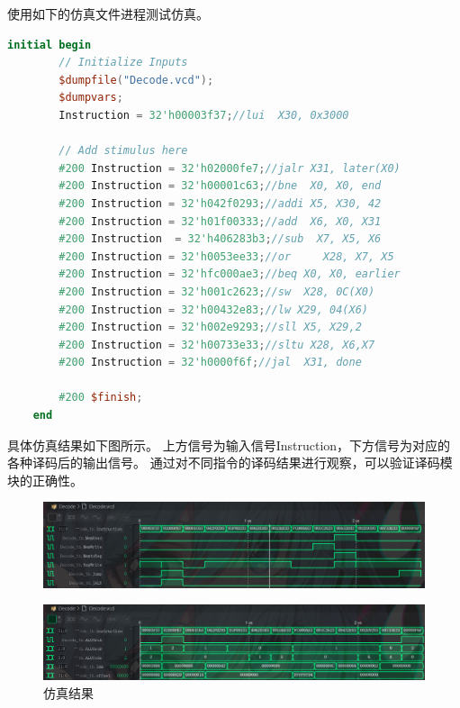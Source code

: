 \documentclass[12pt,hyperref,a4paper,UTF8]{ctexart}
\begin{document}
使用如下的仿真文件进程测试仿真。
\begin{lstlisting}[language=Verilog,caption=仿真tb文件]
	initial begin
		// Initialize Inputs
		$dumpfile("Decode.vcd");
        $dumpvars;
		Instruction = 32'h00003f37;//lui  X30, 0x3000	
        
		// Add stimulus here		
		#200 Instruction = 32'h02000fe7;//jalr X31, later(X0)
		#200 Instruction = 32'h00001c63;//bne  X0, X0, end
		#200 Instruction = 32'h042f0293;//addi X5, X30, 42
		#200 Instruction = 32'h01f00333;//add  X6, X0, X31
		#200 Instruction  = 32'h406283b3;//sub  X7, X5, X6		
		#200 Instruction = 32'h0053ee33;//or	 X28, X7, X5		
		#200 Instruction = 32'hfc000ae3;//beq X0, X0, earlier
		#200 Instruction = 32'h001c2623;//sw  X28, 0C(X0)	
		#200 Instruction = 32'h00432e83;//lw X29, 04(X6)
		#200 Instruction = 32'h002e9293;//sll X5, X29,2
		#200 Instruction = 32'h00733e33;//sltu X28, X6,X7
		#200 Instruction = 32'h0000f6f;//jal  X31, done
	
        #200 $finish;
	end
\end{lstlisting}
  \newpage

    具体仿真结果如下图所示。
    上方信号为输入信号Instruction，下方信号为对应的各种译码后的输出信号。
    通过对不同指令的译码结果进行观察，可以验证译码模块的正确性。
    \begin{figure}[H]
        \centering
        \includegraphics[width=1\textwidth]{figures/fig/sim1.png}
    \end{figure}

    \begin{figure}[H]
        \centering
        \includegraphics[width=1\textwidth]{figures/fig/sim2.png}
        \caption{仿真结果}
    \end{figure}
\end{document}
